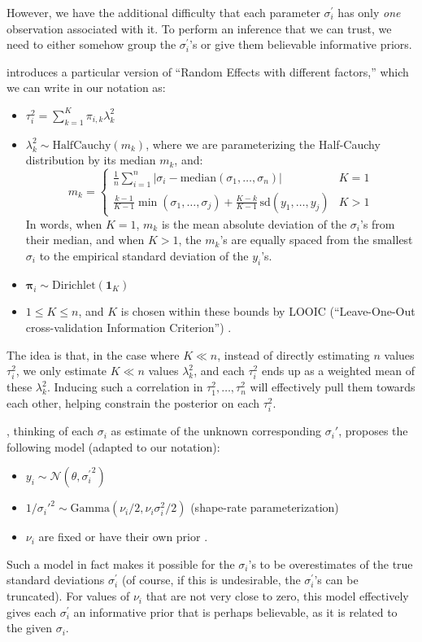 \documentclass[12pt]{article}
\begin{document}
However, we have the additional difficulty that each parameter $\sigma_i^\prime$ has only \textit{one} observation associated with it. To perform an inference that we can trust, we need to either somehow group the $\sigma_i^\prime$'s or give them believable informative priors.

\citet[sec. 5.1]{merkatas2019shades} introduces a particular version of ``Random Effects with different factors,'' which we can write in our notation as:
\begin{itemize}
  \item $\tau_i^2=\sum_{k=1}^K\pi_{i,k}\lambda^2_k$
  \item $\lambda^2_k\sim\mathrm{HalfCauchy}(m_k)$, where we are parameterizing the Half-Cauchy distribution by its median $m_k$, and:
  \[
  m_k=\begin{cases}
    \frac{1}{n}\sum_{i=1}^n|\sigma_i-\mathrm{median}(\sigma_1,\ldots,\sigma_n)| & K=1\\
    \frac{k-1}{K-1}\min(\sigma_1,\ldots,\sigma_j)+\frac{K-k}{K-1}\,\mathrm{sd}(y_1,\ldots,y_j) & K>1
    \end{cases}
  \]
  In words, when $K=1$, $m_k$ is the mean absolute deviation of the $\sigma_i$'s from their median, and when $K>1$, the $m_k$'s are equally spaced from the smallest $\sigma_i$ to the empirical standard deviation of the $y_i$'s.
  \item $\bm{\pi}_{i}\sim\mathrm{Dirichlet}(\bm{1}_K)$
  \item $1\leq K\leq n$, and $K$ is chosen within these bounds by LOOIC (``Leave-One-Out cross-validation Information Criterion'') \citep[sec. 5.2]{merkatas2019shades}.
\end{itemize}
The idea is that, in the case where $K\ll n$, instead of directly estimating $n$ values $\tau_i^2$, we only estimate $K\ll n$ values $\lambda_k^2$, and each $\tau_i^2$ ends up as a weighted mean of these $\lambda_k^2$. Inducing such a correlation in $\tau_1^2,\ldots,\tau_n^2$ will effectively pull them towards each other, helping constrain the posterior on each $\tau_i^2$.

\citet{forbes2016hierarchical}, thinking of each $\sigma_i$ as estimate of the unknown corresponding $\sigma_i'$, proposes the following model (adapted to our notation):
\begin{itemize}
  \item $y_i\sim \mathcal{N}(\theta,{\sigma_i^\prime}^2)$
  \item $1/\sigma_i'^2\sim\mathrm{Gamma}(\nu_i/2,\nu_i\sigma^2_i/2)$ (shape-rate parameterization)
  \item $\nu_i$ are fixed or have their own prior \citep[sec. 3.1, 3.3]{forbes2016hierarchical}.
\end{itemize}
Such a model in fact makes it possible for the $\sigma_i$'s to be overestimates of the true standard deviations $\sigma_i^\prime$ (of course, if this is undesirable, the $\sigma_i^\prime$'s can be truncated). For values of $\nu_i$ that are not very close to zero, this model effectively gives each $\sigma_i^\prime$ an informative prior that is perhaps believable, as it is related to the given $\sigma_i$.
\end{document}
